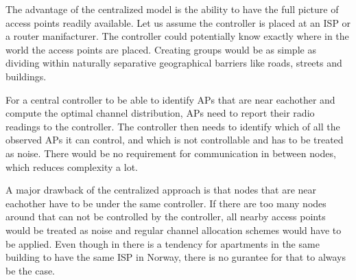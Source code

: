 The advantage of the centralized model is the ability to have the full picture of access points readily available. Let us assume the controller is placed at an ISP or a router manifacturer.
The controller could potentially know exactly where in the world the access points are placed. Creating groups would
be as simple as dividing within naturally separative geographical barriers like roads, streets and buildings. 

For a central controller to be able to identify APs that are near eachother and compute the optimal channel distribution, APs need to report their radio readings to the controller. 
The controller then needs to identify which of all the observed APs it can control, and which is not controllable and has to be treated as noise. There would be no requirement for
communication in between nodes, which reduces complexity a lot.  

A major drawback of the centralized approach is that nodes that are near eachother have to be under the same controller. If there are too many nodes around
that can not be controlled by the controller, all nearby access points would be treated as noise and regular channel allocation schemes would have to be applied.
Even though in there is a tendency for apartments in the same building to have the same ISP in Norway, there is no gurantee for that to always be the case.  

